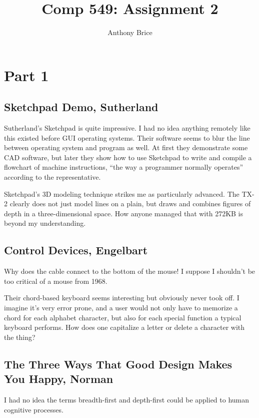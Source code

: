 \documentclass{abrice}
\title{Comp 549: Assignment 2}
\author{Anthony Brice}
\begin{document}
\maketitle

\section{Part 1}

\subsection{Sketchpad Demo, Sutherland}

Sutherland's Sketchpad is quite impressive. I had no idea anything remotely like
this existed before GUI operating systems. Their software seems to blur the line
between operating system and program as well. At first they demonstrate some CAD
software, but later they show how to use Sketchpad to write and compile a
flowchart of machine instructions, ``the way a programmer normally operates''
according to the representative.

Sketchpad's 3D modeling technique strikes me as particularly advanced. The TX-2
clearly does not just model lines on a plain, but draws and combines figures of
depth in a three-dimensional space. How anyone managed that with 272KB is
beyond my understanding.

\subsection{Control Devices, Engelbart}

Why does the cable connect to the bottom of the mouse! I suppose I shouldn't be
too critical of a mouse from 1968.

Their chord-based keyboard seems interesting but obviously never took off. I
imagine it's very error prone, and a user would not only have to memorize a
chord for each alphabet character, but also for each special function a typical
keyboard performs. How does one capitalize a letter or delete a character with
the thing?

\subsection{The Three Ways That Good Design Makes You Happy, Norman}

I had no idea the terms breadth-first and depth-first could be applied to human
cognitive processes.
\end{document}
